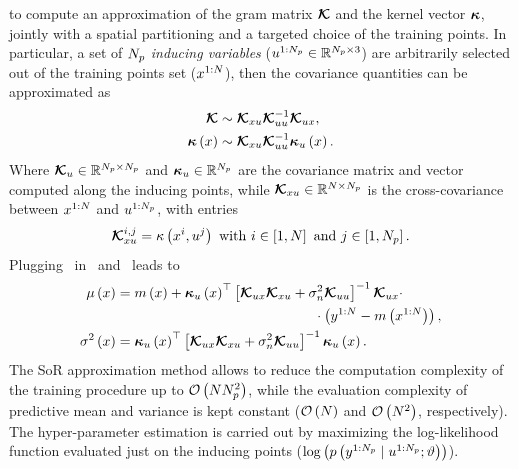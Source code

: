 to compute an approximation of the gram matrix $\boldsymbol{\mathcal{K}}$ and the kernel vector $\boldsymbol{\kappa}$, jointly with a spatial partitioning and a targeted choice
of the training points. In particular, a set of $N_p$ \textit{inducing variables} ($u^{1:N_p} \in \mathbb{R}^{N_p\times3}$)
are arbitrarily selected out of the training points set ($x^{1:N}$), then the covariance quantities can be approximated as
\begin{equation}%
	\label{EQ:SEARCH-SOR-APPROX}
	\begin{split}
		\km & \sim \km_{\xx\uu}  \km_{\uu\uu}^{-1} \km_{\uu\xx},\\
		\kv \lp \xx \rp & \sim \km_{\xx\uu} \km_{\uu\uu}^{-1} \kv_{\uu} \lp \xx \rp.
	\end{split}
\end{equation}
Where $\boldsymbol{\mathcal{K}}_{u} \in \mathbb{R}^{N_p \times N_p}$ and $\boldsymbol{\kappa}_{u} \in \mathbb{R}^{N_p}$ are the covariance matrix and vector computed
along the inducing points, while $\boldsymbol{\mathcal{K}}_{xu} \in \mathbb{R}^{N \times N_p}$ is the cross-covariance between $x^{1:N}$ and
$u^{1:N_p}$, with entries
\begin{equation*}
	\boldsymbol{\mathcal{K}}^{i,j}_{xu} = \kappa \left( x^i, u^j \right) \text{ with } i \in \left[ 1, N \right] \text{ and } j \in \left[ 1, N_p \right].
\end{equation*}
Plugging~ in~ and~ leads to
\begin{align*}
		\pmu \lp \xx \rp & = \prior \lp \xx \rp + \kv_{\uu} \lp \xx \rp\T \lps \km_{\uu\xx}\km_{\xx\uu} + \nn \km_{\uu\uu} \rps^{-1} \km_{\uu\xx} \cdot \\
						& \hspace{5cm} \cdot \lp \yy^{1:\nsample} - \prior \lp \xx^{1:\nsample} \rp \rp, \\
		\pvar \lp \xx \rp & = \kv_{\uu} \lp \xx \rp\T \lps \km_{\uu\xx}\km_{\xx\uu} + \nn \km_{\uu\uu} \rps^{-1} \kv_{\uu} \lp \xx \rp.
\end{align*}
The SoR approximation method allows to reduce the computation complexity of the training procedure up to $\mathcal{O} \left( N N_p^2 \right)$,
while the evaluation complexity of predictive mean and variance is kept constant ($\mathcal{O} \left( N \right)$ and $\mathcal{O} \left( N^2 \right)$,
respectively). The hyper-parameter estimation is carried out by maximizing the log-likelihood function evaluated just on the inducing points
($\log \left( p \left( y^{1:N_p} \mid u^{1:N_p}; \vartheta \right) \right)$).
